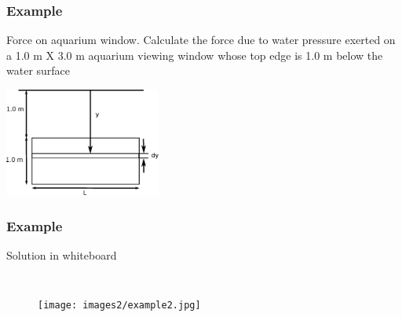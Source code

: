 \documentclass[]{beamer}
\begin{document}

\begin{frame}
\frametitle{Example \theexample}
Force on aquarium window. Calculate the force due to water pressure exerted on a 1.0 m X 3.0 m aquarium viewing window whose top
edge is 1.0 m below the water surface

\vspace{5mm}
\begin{center}
  \includegraphics[height=1.4in]{images2/example2.eps}
\end{center}



  \end{frame}

  \begin{frame}
    \frametitle{Example \theexample }
    \textcolor{mypink1}{Solution in whiteboard}
    
    
    
    
    \begin{columns}[c]
      \column{2in}  %
    
      \begin{figure}[h!]
        \texttt{[image: images2/example2.jpg]}
    \end{figure} 
    
      \column{2in}
    
    
      \end{columns}
    
    
    
    
    
      \end{frame}
\end{document}
